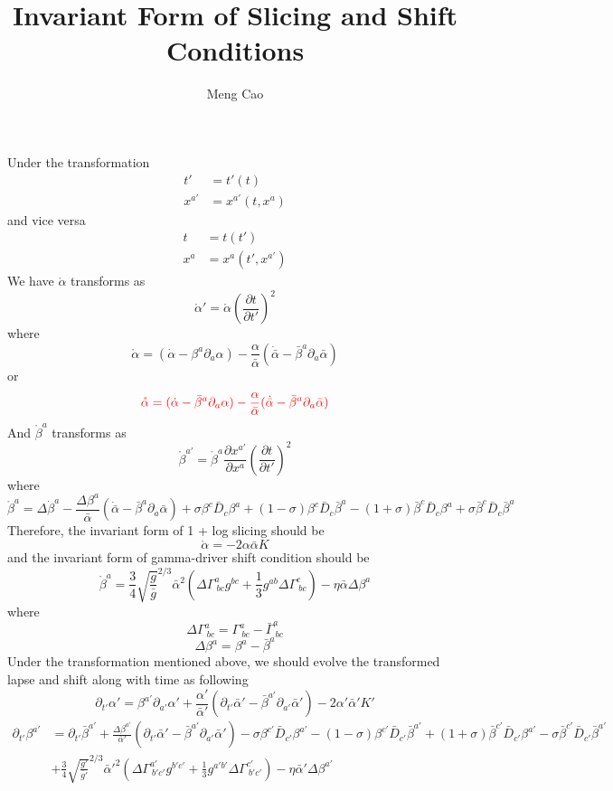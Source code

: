 \documentclass{article}
\begin{document}
\title{Invariant Form of Slicing and Shift Conditions}
\author{Meng Cao}
\maketitle
Under the transformation
\begin{align*}
t' &= t'(t)\\
x^{a'} &= x^{a'}(t,x^{a})
\end{align*}
and vice versa
\begin{align*}
t & = t(t')\\
x^{a} & = x^{a}(t',x^{a'})
\end{align*}
We have $\mathring{\alpha}$ transforms as
\[
\mathring{\alpha}' = \mathring{\alpha}(\frac{\partial t}{\partial t'})^{2}
\]
where
\[
\mathring{\alpha} = ({\dot \alpha} - \beta^{a}\partial_{a}\alpha) - \frac{\alpha}{{\bar \alpha}}({\dot {\bar \alpha}} - {\bar \beta}^{a}\partial_{a}{\bar \alpha})
\]
or
\[
{\color{red}
\mathring{\alpha} = ({\dot \alpha} - {\bar \beta}^{a}\partial_{a}\alpha) - \frac{\alpha}{{\bar \alpha}}({\dot {\bar \alpha}} - {\bar \beta}^{a}\partial_{a}{\bar \alpha})
}
\]
And $\mathring{\beta}^{a}$ transforms as
\[
\mathring{\beta}^{a'} = \mathring{\beta}^{a}\frac{\partial x^{a'}}{\partial x^{a}}(\frac{\partial t}{\partial t'})^{2}
\]
where
\[
\mathring{\beta}^{a} =  \Delta {\dot \beta}^{a} -\frac{\Delta \beta^{a}}{{\bar \alpha}}({\dot {\bar \alpha}} - {\bar \beta}^{a}\partial_{a}{\bar \alpha})+ \sigma \beta^{c}{\bar D}_{c}\beta^{a} + (1 - \sigma)\beta^{c}{\bar D}_{c}{\bar \beta}^{a} - (1 + \sigma){\bar \beta}^{c}{\bar D}_{c}\beta^{a} + \sigma{\bar \beta}^{c}{\bar D}_{c}{\bar \beta}^{a}
\]
Therefore, the invariant form of 1 + log slicing should be
\[
\mathring{\alpha} = -2\alpha{\bar \alpha}K
\]
and the invariant form of gamma-driver shift condition should be
\[
\mathring{\beta}^{a} = \frac{3}{4}\sqrt{\frac{g}{{\bar g}}}^{2/3}{\bar \alpha}^{2}(\Delta \Gamma^{a}_{~bc}g^{bc} + \frac{1}{3}g^{ab}\Delta\Gamma^{c}_{~bc}) - \eta {\bar \alpha}\Delta\beta^{a} 
\]
where
\[
\Delta \Gamma^{a}_{~bc} = \Gamma^{a}_{~bc} - {\bar \Gamma}^{a}_{~bc}
\]
\[
\Delta \beta^{a} = \beta^{a} - {\bar \beta}^{a}
\]
Under the transformation mentioned above, we should evolve the transformed lapse and shift along with time as following
\[
\partial_{t'}\alpha' = \beta^{a'}\partial_{a'}\alpha' + \frac{\alpha'}{{\bar \alpha}'}(\partial_{t'}{\bar \alpha}' - {\bar \beta}^{a'}\partial_{a'}{\bar \alpha}') - 2\alpha'{\bar \alpha}'K'
\]
\begin{align*}
\partial_{t'}\beta^{a'} & = \partial_{t'}{\bar \beta}^{a'} + \frac{\Delta \beta^{a'}}{{\bar \alpha}'}(\partial_{t'} {\bar \alpha}' - {\bar \beta}^{a'}\partial_{a'}{\bar \alpha}') - \sigma \beta^{c'}{\bar D}_{c'}\beta^{a'} - (1 - \sigma)\beta^{c'}{\bar D}_{c'}{\bar \beta}^{a'} + (1 + \sigma){\bar \beta}^{c'}{\bar D}_{c'}\beta^{a'} - \sigma{\bar \beta}^{c'}{\bar D}_{c'}{\bar \beta}^{a'}\\
&+ \frac{3}{4}\sqrt{\frac{g'}{{\bar g}'}}^{2/3}{\bar \alpha}'^{2}(\Delta \Gamma^{a'}_{~b'c'}g^{b'c'} + \frac{1}{3}g^{a'b'}\Delta\Gamma^{c'}_{~b'c'}) - \eta {\bar \alpha}'\Delta\beta^{a'} 
\end{align*}
\end{document}
